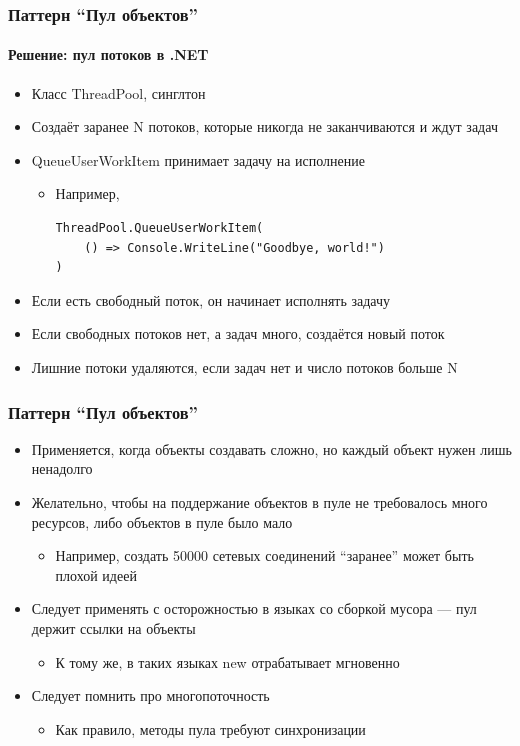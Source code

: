 \documentclass{../../slides-style}
\begin{document}
    \begin{frame}[fragile]
        \frametitle{Паттерн ``Пул объектов''}
        \framesubtitle{Решение: пул потоков в .NET}
        \begin{itemize}
            \item Класс ThreadPool, синглтон
            \item Создаёт заранее N потоков, которые никогда не заканчиваются и ждут задач
            \item QueueUserWorkItem принимает задачу на исполнение
            \begin{itemize}
                \item Например, 
                \begin{footnotesize}
                    \begin{verbatim}
ThreadPool.QueueUserWorkItem(
    () => Console.WriteLine("Goodbye, world!")
)
                    \end{verbatim}
                \end{footnotesize}
            \end{itemize}
            \item Если есть свободный поток, он начинает исполнять задачу
            \item Если свободных потоков нет, а задач много, создаётся новый поток
            \item Лишние потоки удаляются, если задач нет и число потоков больше N
        \end{itemize}
    \end{frame}

    \begin{frame}
        \frametitle{Паттерн ``Пул объектов''}
        \begin{itemize}
            \item Применяется, когда объекты создавать сложно, но каждый объект нужен лишь ненадолго
            \item Желательно, чтобы на поддержание объектов в пуле не требовалось много ресурсов, либо объектов в пуле было мало
            \begin{itemize}
                \item Например, создать 50000 сетевых соединений ``заранее'' может быть плохой идеей
            \end{itemize}
            \item Следует применять с осторожностью в языках со сборкой мусора --- пул держит ссылки на объекты
            \begin{itemize}
                \item К тому же, в таких языках new отрабатывает мгновенно
            \end{itemize}
            \item Следует помнить про многопоточность
            \begin{itemize}
                \item Как правило, методы пула требуют синхронизации
            \end{itemize}
        \end{itemize}
    \end{frame}
\end{document}
